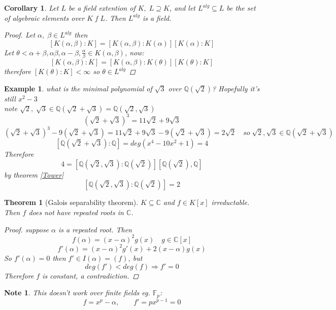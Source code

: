 \documentclass[12pt]{article}
\def\CC{\mathbb{C}}
\def\QQ{\mathbb{Q}}
\newtheorem{theorem}{Theorem}[section]
\newtheorem{example}{Example}[section]
\newtheorem{corollary}{Corollary}[section]
\newtheorem*{note}{Note}
\begin{document}
\begin{corollary}
Let $L$ be a field extention of $K, \; L\supseteq K$, and let $L^{alg} \subseteq L$ be the set of algebraic elements over $K$ f $L$. Then $L^{alg}$ is a field.
\begin{proof}
Let $\alpha, \; \beta \in L^{alg}$ then
\[ [K(\alpha , \beta):K] = [K(\alpha , \beta):K(\alpha)][K(\alpha):K] \]
Let $\theta < \alpha + \beta, \alpha\beta, \alpha - \beta, \frac{\alpha}{\beta} \in K(\alpha, \beta)$, now:
\[[K(\alpha , \beta):K] = [K(\alpha , \beta):K(\theta)][K(\theta):K] \]
therefore $[K(\theta):K]< \infty$ so $\theta \in L^{alg}$
\end{proof}
\end{corollary}

\begin{example}
what is the minimal polynomial of $\sqrt{3}$ over $\QQ(\sqrt{2})$? Hopefully it's still $x^2 -3$\\
note $\sqrt{2}, \; \sqrt{3} \in \QQ(\sqrt{2} + \sqrt{3})  = \QQ(\sqrt{2} , \sqrt{3})$
\[ (\sqrt{2} + \sqrt{3}) ^3 =  11\sqrt{2} + 9\sqrt{3}\]
\[(\sqrt{2} + \sqrt{3}) ^3 - 9(\sqrt{2} + \sqrt{3}) =  11\sqrt{2} + 9\sqrt{3} - 9 (\sqrt{2} + \sqrt{3}) = 2\sqrt{2}\quad so \; \sqrt{2}, \sqrt{3} \in \QQ(\sqrt{2} + \sqrt{3})\]
\[ [\QQ(\sqrt{2} + \sqrt{3}):\QQ] = deg(x^4 - 10x^2 +1) = 4\]
Therefore
\[4= [\QQ(\sqrt{2}, \sqrt{3}):\QQ(\sqrt{2})][\QQ(\sqrt{2}), \QQ] \]
by theorem \ref{Tower}
\[ [\QQ(\sqrt{2}, \sqrt{3}):\QQ(\sqrt{2})] = 2 \]
\end{example}

\begin{theorem}[Galois separability theorem]\label{sep}
$K \subseteq \CC$ and $f \in K[x]$ irreductable. Then $f$ does not have repeated roots in $\CC$. 
\begin{proof}
suppose $\alpha$ is a repeated root. Then
\[f(\alpha) = (x-\alpha)^2g(x) \quad g \in \CC[x]\]
\[ f'(\alpha) = (x-\alpha)^2g'(x)+ 2(x-\alpha)g(x)\]
So $f'(\alpha) =0$ then $f' \in I(\alpha) = (f)$, but 
\[deg(f')<deg(f) \Rightarrow f' = 0\]
Therefore $f$ is constant, a contradiction.
\end{proof}
\end{theorem}
\begin{note}
This doesn't work over finite fields eg. $\mathbb{F}_{p}$:
\[f=x^p -\alpha, \qquad f' = px^{p-1} =0\]
\end{note}
\end{document}
